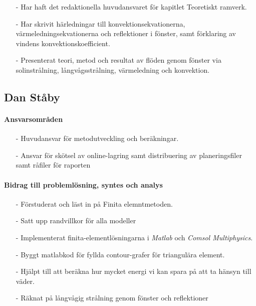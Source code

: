\documentclass[12pt,a4paper]{article}
\begin{document}
\begin{itemize}
\item[-] Har haft det redaktionella huvudansvaret för kapitlet Teoretiskt ramverk.
\item[-] Har skrivit härledningar till konvektionsekvationerna, värmeledningsekvationerna och reflektioner i fönster, samt förklaring av vindens konvektionskoefficient.
\item[-] Presenterat teori, metod och resultat av flöden genom fönster via solinstrålning, långvågsstrålning, värmeledning och konvektion.
\end{itemize}


\subsection*{Dan Ståby}

\paragraph{Ansvarsområden}

\begin{itemize}
\item[-] Huvudansvar för metodutveckling och beräkningar.
\item[-] Ansvar för skötsel av online-lagring samt distribuering av planeringsfiler samt råfiler för raporten
\end{itemize}

 \paragraph{Bidrag till problemlösning, syntes och analys}

\begin{itemize}
\item[-] Förstuderat och läst in på Finita elemntmetoden.
\item[-] Satt upp randvillkor för alla modeller
\item[-] Implementerat finita-elementlösningarna i \emph{Matlab} och \emph{Comsol Multiphysics}.
\item[-] Byggt matlabkod för fyllda contour-grafer för triangulära element.
\item[-] Hjälpt till att beräkna hur mycket energi vi kan spara på att ta hänsyn till väder.
\item[-] Räknat på långvågig strålning genom fönster och reflektioner
\end{itemize}
\end{document}
